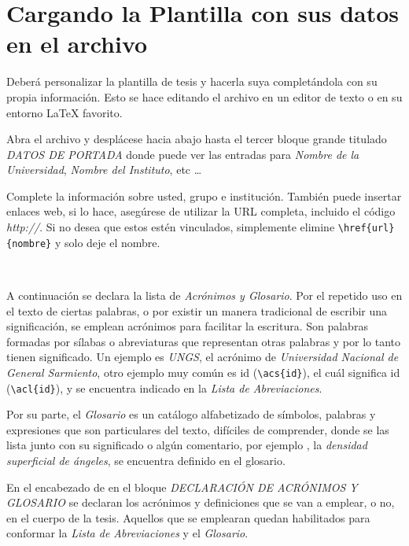 
\section{Cargando la Plantilla con sus datos en  el archivo  }\label{CargaArchivo}


Deberá personalizar la plantilla de tesis y hacerla suya completándola con  su propia información. Esto se hace editando el archivo  en un editor de texto o en su entorno \LaTeX{} favorito.

Abra el archivo y desplácese hacia abajo hasta el tercer bloque grande titulado \emph{DATOS DE PORTADA} donde puede ver las entradas para \emph{Nombre de la Universidad}, \emph{Nombre del Instituto}, etc \ldots

Complete la información sobre usted, grupo e institución. También puede insertar enlaces web, si lo hace, asegúrese de utilizar la URL completa, incluido el código \emph{http://}. Si no desea que estos estén vinculados, simplemente elimine \verb|\href{url}{nombre}| y solo deje el nombre.

\

A continuación se declara la lista de \emph{Acrónimos y Glosario}. Por el repetido uso en el texto de ciertas palabras, o por existir un manera tradicional de escribir una significación, se emplean acrónimos para facilitar la escritura. Son palabras formadas por sílabas o abreviaturas que representan otras palabras y por lo tanto tienen significado. Un ejemplo es \emph{UNGS}, el acrónimo de \emph{Universidad Nacional de General Sarmiento}, otro ejemplo muy común es  \acs{id} (\verb*|\acs{id}|), el cuál significa  \acl{id} (\verb*|\acl{id}|), y se encuentra indicado en la \emph{Lista de Abreviaciones}.  

Por su parte, el \emph{Glosario} es un catálogo alfabetizado de símbolos, palabras y expresiones que son particulares del texto, difíciles de comprender, donde se las lista junto con su significado o algún comentario, por ejemplo , la \emph{densidad superficial de ángeles}, se encuentra definido en el glosario.

En el encabezado de  en el bloque \emph{DECLARACIÓN DE ACRÓNIMOS Y GLOSARIO} se declaran los acrónimos y definiciones que se van a emplear, o no, en el cuerpo de la tesis. Aquellos que se emplearan quedan habilitados para conformar la \emph{Lista de Abreviaciones} y el \emph{Glosario}. 

